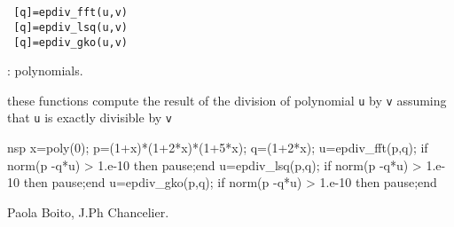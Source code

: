 \begin{mandesc}
  \\ 
  \\ 
\end{mandesc}
\begin{calling_sequence}
\begin{verbatim}
 [q]=epdiv_fft(u,v)
 [q]=epdiv_lsq(u,v)
 [q]=epdiv_gko(u,v)
\end{verbatim}
\end{calling_sequence}
\begin{parameters}
  \begin{varlist}
    : polynomials. 
  \end{varlist}
\end{parameters}
\begin{mandescription}
  these functions compute the result of the division of polynomial \verb+u+ by 
  \verb+v+ assuming that \verb+u+ is exactly divisible by \verb+v+
\end{mandescription}
\begin{examples}
  \begin{mintednsp}{nsp}
  x=poly(0);
  p=(1+x)*(1+2*x)*(1+5*x);
  q=(1+2*x);
  u=epdiv_fft(p,q);
  if norm(p -q*u) > 1.e-10 then pause;end 
  u=epdiv_lsq(p,q);
  if norm(p -q*u) > 1.e-10 then pause;end 
  u=epdiv_gko(p,q);
  if norm(p -q*u) > 1.e-10 then pause;end 
  \end{mintednsp}
\end{examples}
\begin{manseealso}
\end{manseealso}
\begin{authors}
  Paola Boito,  J.Ph Chancelier. 
\end{authors}

